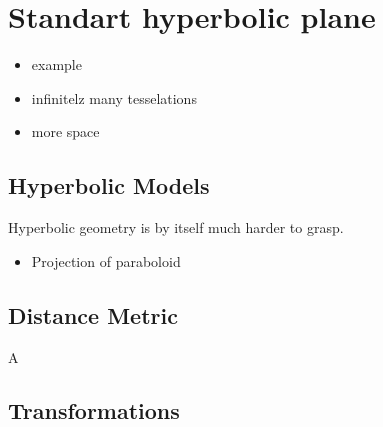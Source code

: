 \section{Standart hyperbolic plane}\label{standart-hyperbolic-plane}

\begin{itemize}
\tightlist
\item[$\square$]
  example
\item[$\square$]
  infinitelz many tesselations
\item[$\square$]
  more space
\end{itemize}

\subsection{Hyperbolic Models}\label{hyperbolic-models}

Hyperbolic geometry is by itself much harder to grasp.

\begin{itemize}
\tightlist
\item[$\square$]
  Projection of paraboloid
\end{itemize}

\subsection{Distance Metric}\label{distance-metric}

A

\subsection{Transformations}\label{transformations}
